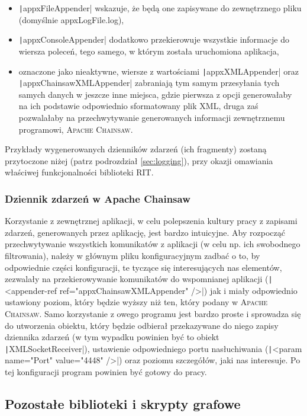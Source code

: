 \begin{itemize}
	\item \texttt|appxFileAppender| wskazuje, że będą one zapisywane do zewnętrznego pliku (domyślnie \textsf{appxLogFile.log}),
	\item \texttt|appxConsoleAppender|  dodatkowo przekierowuje wszystkie informacje do wiersza poleceń, tego samego, w którym została uruchomiona aplikacja,
	\item oznaczone jako nieaktywne, wiersze z wartościami \texttt|appxXMLAppender| oraz \texttt|appxChainsawXMLAppender| zabraniają tym samym przesyłania tych samych danych w jeszcze inne miejsca, gdzie pierwsza z opcji generowałaby na ich podstawie odpowiednio sformatowany plik \textsc{XML}, druga zaś pozwalałaby na przechwytywanie generowanych informacji zewnętrznemu programowi, \textsc{Apache Chainsaw}.
\end{itemize}

Przykłady wygenerowanych dzienników zdarzeń (ich fragmenty) zostaną przytoczone niżej (patrz podrozdział \ref{sec:logging}), przy okazji omawiania właściwej funkcjonalności biblioteki \textsc{RIT}.

\subsubsection{Dziennik zdarzeń w Apache Chainsaw}

Korzystanie z zewnętrznej aplikacji, w celu polepszenia kultury pracy z zapisami zdarzeń, generowanych przez aplikację, jest bardzo intuicyjne. Aby rozpocząć przechwytywanie wszystkich komunikatów z aplikacji (w celu np. ich swobodnego filtrowania), należy w głównym pliku konfiguracyjnym zadbać o to, by odpowiednie części konfiguracji, te tyczące się interesujących nas elementów, zezwalały na przekierowywanie komunikatów do wspomnianej aplikacji (\texttt|<appender-ref ref="appxChainsawXMLAppender" />|) jak i miały odpowiednio ustawiony poziom, który będzie wyższy niż ten, który podany w \textsc{Apache Chainsaw}. Samo korzystanie z owego programu jest bardzo proste i sprowadza się do utworzenia obiektu, który będzie odbierał przekazywane do niego zapisy dziennika zdarzeń (w tym wypadku powinien być to obiekt \texttt|XMLSocketReceiver|), ustawienie odpowiedniego portu nasłuchiwania (\texttt|<param name="Port" value="4448" />|) oraz poziomu szczegółów, jaki nas interesuje. Po tej konfiguracji program powinien być gotowy do pracy.

\subsection{Pozostałe biblioteki i skrypty grafowe}

